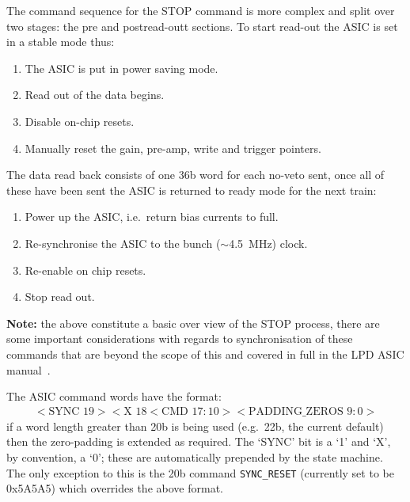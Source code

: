 The command sequence for the STOP command is more complex and split over two stages: the pre and postread-outt sections. To start read-out the ASIC is set in a stable mode thus:
\begin{enumerate}
  \item The ASIC is put in power saving mode.
  \item Read out of the data begins.
  \item Disable on-chip resets.
  \item Manually reset the gain, pre-amp, write and trigger pointers.
\end{enumerate}
The data read back consists of one 36b word for each no-veto sent, once all of these have been sent the ASIC is returned to ready mode for the next train:
\begin{enumerate}
  \item Power up the ASIC, i.e.\ return bias currents to full.
  \item Re-synchronise the ASIC to the bunch (\( \sim \)4.5~MHz) clock.
  \item Re-enable on chip resets.
  \item Stop read out.
\end{enumerate}
\textbf{Note:} the above constitute a basic over view of the STOP process, there are some important considerations with regards to synchronisation of these commands that are beyond the scope of this and covered in full in the LPD ASIC manual~\cite{lpd_manual}.

The ASIC command words have the format:
\begin{align}\label{fmt:asic_format}
  <\text{SYNC }19><\text{X }18<\text{CMD } 17:10><\text{PADDING\_ZEROS } 9:0>
\end{align}
if a word length greater than 20b is being used (e.g.\ 22b, the current default) then the zero-padding is extended as required. The `SYNC' bit is a `1' and `X', by convention, a `0'; these are automatically prepended by the state machine. The only exception to this is the 20b command \texttt{SYNC\_RESET} (currently set to be 0x5A5A5) which overrides the above format.

